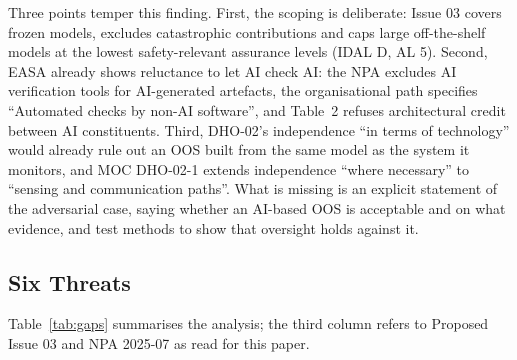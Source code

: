 \documentclass{aer}
\begin{document}
Three points temper this finding. First, the scoping is deliberate: Issue 03 covers frozen models, excludes catastrophic contributions and caps large off-the-shelf models at the lowest safety-relevant assurance levels (IDAL D, AL 5). Second, EASA already shows reluctance to let AI check AI: the NPA excludes AI verification tools for AI-generated artefacts, the organisational path specifies ``Automated checks by non-AI software'', and Table~2 refuses architectural credit between AI constituents. Third, DHO-02's independence ``in terms of technology'' would already rule out an OOS built from the same model as the system it monitors, and MOC DHO-02-1 extends independence ``where necessary'' to ``sensing and communication paths''. What is missing is an explicit statement of the adversarial case, saying whether an AI-based OOS is acceptable and on what evidence, and test methods to show that oversight holds against it.

\subsection{Six Threats}\label{sec:threats}

Table~\ref{tab:gaps} summarises the analysis; the third column refers to Proposed Issue 03 and NPA 2025-07 as read for this paper.
\end{document}
